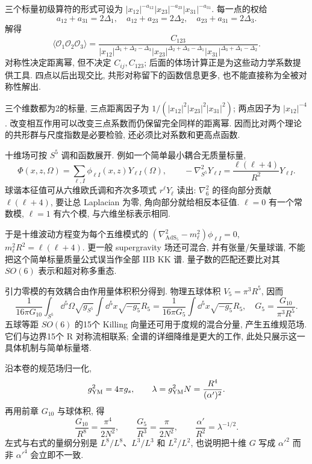 三个标量初级算符的形式可设为 $|x_{12}|^{-a_{12}}|x_{23}|^{-a_{23}}|x_{31}|^{-a_{31}}$. 每一点的权给
\[
a_{12}+a_{31}=2\Delta_1,\quad
a_{12}+a_{23}=2\Delta_2,\quad
a_{23}+a_{31}=2\Delta_3.
\]
解得
\[
\langle\mathcal O_1\mathcal O_2\mathcal O_3\rangle
=\frac{C_{123}}{
|x_{12}|^{\Delta_1+\Delta_2-\Delta_3}
|x_{23}|^{\Delta_2+\Delta_3-\Delta_1}
|x_{31}|^{\Delta_3+\Delta_1-\Delta_2}}.
\]
对称性决定距离幂, 但不决定 $C_{ij},C_{123}$; 后面的体场计算正是为这些动力学系数提供工具. 四点以后出现交比, 共形对称留下的函数信息更多, 也不能直接称为全被对称性解出.

\begin{example}
三个维数都为2的标量, 三点距离因子为 $1/(|x_{12}|^2|x_{23}|^2|x_{31}|^2)$; 两点因子为 $|x_{12}|^{-4}$. 改变相互作用可以改变三点系数而仍保留完全同样的距离幂. 因而比对两个理论的共形群与尺度指数是必要检验, 还必须比对系数和更高点函数.
\end{example}

十维场可按 $S^5$ 调和函数展开. 例如一个简单最小耦合无质量标量,
\[
\Phi(x,z,\Omega)=\sum_{\ell,I}\phi_{\ell I}(x,z)Y_{\ell I}(\Omega),
\qquad-\nabla^2_{S^5}Y_{\ell I}
=\frac{\ell(\ell+4)}{R^2}Y_{\ell I}.
\]
球谐本征值可从六维欧氏调和齐次多项式 $r^\ell Y_\ell$ 读出: $\nabla_6^2$ 的径向部分贡献 $\ell(\ell+4)$, 要让总 Laplacian 为零, 角向部分就给相反本征值. $\ell=0$ 有一个常数模, $\ell=1$ 有六个模, 与六维坐标表示相同.

于是十维波动方程变为每个五维模式的 $(\nabla^2_{\mathrm{AdS}_5}-m_\ell^2)\phi_{\ell I}=0$, $m_\ell^2R^2=\ell(\ell+4)$. 更一般 supergravity 场还可混合, 并有张量/矢量球谐, 不能把这个简单标量质量公式误当作全部 IIB KK 谱. 量子数的匹配还要比对其 $SO(6)$ 表示和超对称多重态.

引力零模的有效耦合由作用量体积积分得到. 物理五球体积 $V_5=\pi^3R^5$, 因而
\[
\frac1{16\pi G_{10}}\int_{S^5}\dd^5\Omega\sqrt{g_{S^5}}
\int\dd^5x\sqrt{-g_5}R_5
=\frac1{16\pi G_5}\int\dd^5x\sqrt{-g_5}R_5,
\quad G_5=\frac{G_{10}}{\pi^3R^5}.
\]
五球等距 $SO(6)$ 的15个 Killing 向量还可用于度规的混合分量, 产生五维规范场. 它们与边界15个 R 对称流相联系; 全谱的详细降维是更大的工作, 此处只展示这一具体机制与简单标量塔.

沿本卷的规范场归一化,
\[
g_{\rm YM}^2=4\pi g_s,\qquad
\lambda=g_{\rm YM}^2N=\frac{R^4}{(\alpha')^2}.
\]
再用前章 $G_{10}$ 与球体积, 得
\[
\frac{G_{10}}{R^8}=\frac{\pi^4}{2N^2},\qquad
\frac{G_5}{R^3}=\frac{\pi}{2N^2},\qquad
\frac{\alpha'}{R^2}=\lambda^{-1/2}.
\]
左式与右式的量纲分别是 $L^8/L^8$、$L^3/L^3$ 和 $L^2/L^2$, 也说明把十维 $G$ 写成 $\alpha'^2$ 而非 $\alpha'^4$ 会立即不一致.

